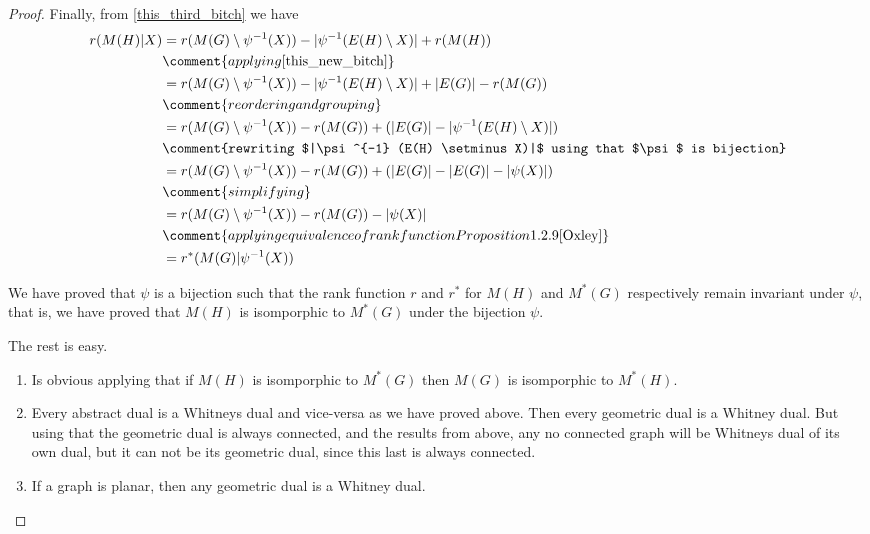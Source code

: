 \begin{proof}
    Finally, from \eqref{this_third_bitch} we have
    \begin{align}
            r(M(H)|X)   &=  r(M(G)\setminus \psi^{-1} (X)) -|\psi^{-1} (E(H) \setminus X)| + r(M(H))                \\
                        &\comment{applying \eqref{this_new_bitch}}                                                  \\
                        &=  r(M(G)\setminus \psi^{-1} (X)) -|\psi^{-1} (E(H) \setminus X)| + |E(G)| - r(M(G))       \\
                        &\comment{reordering and grouping}                                                          \\
                        &=  r(M(G)\setminus \psi^{-1} (X)) - r(M(G))  + (|E(G)| -|\psi^{-1} (E(H) \setminus X)|)    \\
                        &\comment{rewriting $|\psi^{-1} (E(H) \setminus X)|$ using that $\psi$ is bijection}                                                                        \\
                        &=  r(M(G)\setminus \psi^{-1} (X)) - r(M(G))  + (|E(G)| - |E(G)| - |\psi(X)|)               \\
                        &\comment{simplifying}                                                                      \\
                        &=  r(M(G)\setminus \psi^{-1} (X)) - r(M(G))  - |\psi(X)|                                   \\
                        &\comment{applying equivalence of rank function Proposition 1.2.9 \cite{Oxley}}             \\
                        &=  r^*(M(G)|\psi^{-1}(X))
    \end{align}
    
    We have proved that $\psi$ is a bijection such that the rank function $r$ and $r^*$ for $M(H)$ and $M^*(G)$ respectively remain invariant under
    $\psi$, that is, we have proved that $M(H)$ is isomporphic to $M^*(G)$ under the bijection $\psi$.
    
    The rest is easy.\pn
    \begin{enumerate}[label=(\roman*)]
        \item   Is obvious applying that if $M(H)$ is isomporphic to $M^*(G)$ then $M(G)$ is isomporphic to $M^*(H)$.
        \item   Every abstract dual is a Whitneys dual and vice-versa as we have proved above. Then every geometric dual is
                a Whitney dual. But using that the geometric dual is always connected, and the results from above, any
                no connected graph will be Whitneys dual of its own dual, but it can not be its geometric dual, since this last
                is always connected.
        \item   If a graph is planar, then any geometric dual is a Whitney dual. \pn
        

\end{enumerate}
\end{proof}
